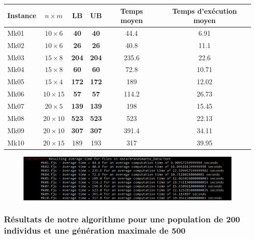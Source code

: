 \begin{table}[!h]
    \renewcommand{\arraystretch}{1.5}
    \centering
    \begin{tabular}{p{} c c c c c}
        Instance & $n \times m$ & LB & UB & Temps moyen & Temps d'exécution moyen \\
         \hline
        Mk01 & $10 \times 6$ & \textbf{40} & \textbf{40} & 44.4 & 6.91 \\
         \hline
        Mk02 & $10 \times 6$ & \textbf{26} & \textbf{26} & 40.8 & 11.1 \\
         \hline
        Mk03 & $15 \times 8$ & \textbf{204} & \textbf{204} & 235.6 & 22.6 \\
         \hline
        Mk04 & $15 \times 8$ & \textbf{60} & \textbf{60} & 72.8 & 10.71 \\
         \hline
        Mk05 & $15 \times 4$ & \textbf{172} & \textbf{172} & 189 & 12.02 \\
         \hline
        Mk06 & $10 \times 15$ & \textbf{57} & \textbf{57} & 114.2 & 26.73 \\
         \hline
        Mk07 & $20 \times 5$ & \textbf{139} & \textbf{139} & 198 & 15.45 \\
         \hline
        Mk08 & $20 \times 10$ & \textbf{523} & \textbf{523} & 523 & 22.13 \\
         \hline
        Mk09 & $20 \times 10$ & \textbf{307} & \textbf{307} & 391.4 & 34.11 \\
         \hline
        Mk10 & $20 \times 15$ & 189 & 193 & 317 & 39.95 \\
         \hline 
    \end{tabular}
\end{table}

\begin{figure}[!h]
    \centering
    \includegraphics[width=\linewidth]{report/Pictures/brandimarte_50_150.png}
\end{figure}

\subsubsection{Résultats de notre algorithme pour une population de 200 individus et une génération maximale de 500}

